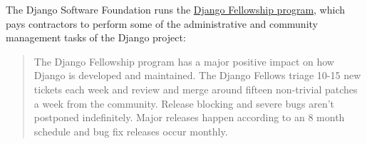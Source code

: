 \begin{kaobox}[frametitle=Django Fellowship Program]

The Django Software Foundation runs the \href{https://www.djangoproject.com/fundraising/#fellowship-program}{Django Fellowship program}, which pays contractors to perform some of the administrative and community management tasks of the Django project:

\begin{quote}

The Django Fellowship program has a major positive impact on how Django is developed and maintained. The Django Fellows triage 10-15 new tickets each week and review and merge around fifteen non-trivial patches a week from the community. Release blocking and severe bugs aren't postponed indefinitely. Major releases happen according to an 8 month schedule and bug fix releases occur monthly.

\end{quote}

\end{kaobox}

